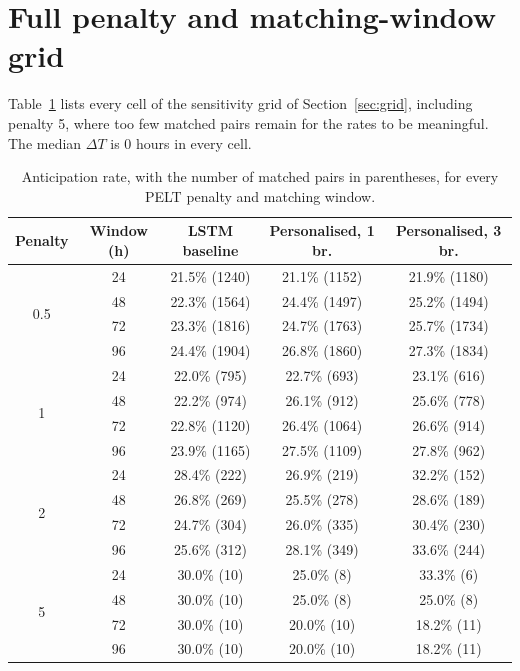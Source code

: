 \documentclass[preprint,12pt,authoryear]{elsarticle}
\newcommand{\dt}{$\Delta T$}
\providecommand{\DIFaddtex}[1]{{\protect\color{blue} \sf #1}} %
\providecommand{\DIFaddbegin}{} %
\providecommand{\DIFaddend}{} %
\providecommand{\DIFadd}[1]{\texorpdfstring{\DIFaddtex{#1}}{#1}} %
\newcommand{\DIFaddincludegraphics}[2][]{{\color{blue}\fbox{\DIFOincludegraphics[#1]{#2}}}} %
\DeclareRobustCommand{\DIFaddbegin}{\DIFOaddbegin \let\includegraphics\DIFaddincludegraphics} %
\DeclareRobustCommand{\DIFaddend}{\DIFOaddend \let\includegraphics\DIFOincludegraphics} %
\begin{document}
\section{Full penalty and matching-window grid}
\label{app:grid}

\DIFadd{Table~\ref{tab:grid} lists every cell of the sensitivity grid of
Section~\ref{sec:grid}, including penalty 5, where too few matched
pairs remain for the rates to be meaningful. The median \dt{} is 0
hours in every cell}\DIFaddend .

\DIFaddbegin \begin{table}[h]
\centering
\caption{Anticipation rate, with the number of matched pairs in
parentheses, for every PELT penalty and matching window.}
\label{tab:grid}
\small
\begin{tabular}{ccccc}
\toprule
Penalty & Window (h) & LSTM baseline & Personalised, 1 br. & Personalised, 3 br. \\
\midrule
\multirow{4}{*}{0.5} & 24 & 21.5\% (1240) & 21.1\% (1152) & 21.9\% (1180) \\
 & 48 & 22.3\% (1564) & 24.4\% (1497) & 25.2\% (1494) \\
 & 72 & 23.3\% (1816) & 24.7\% (1763) & 25.7\% (1734) \\
 & 96 & 24.4\% (1904) & 26.8\% (1860) & 27.3\% (1834) \\
\midrule
\multirow{4}{*}{1} & 24 & 22.0\% (795) & 22.7\% (693) & 23.1\% (616) \\
 & 48 & 22.2\% (974) & 26.1\% (912) & 25.6\% (778) \\
 & 72 & 22.8\% (1120) & 26.4\% (1064) & 26.6\% (914) \\
 & 96 & 23.9\% (1165) & 27.5\% (1109) & 27.8\% (962) \\
\midrule
\multirow{4}{*}{2} & 24 & 28.4\% (222) & 26.9\% (219) & 32.2\% (152) \\
 & 48 & 26.8\% (269) & 25.5\% (278) & 28.6\% (189) \\
 & 72 & 24.7\% (304) & 26.0\% (335) & 30.4\% (230) \\
 & 96 & 25.6\% (312) & 28.1\% (349) & 33.6\% (244) \\
\midrule
\multirow{4}{*}{5} & 24 & 30.0\% (10) & 25.0\% (8) & 33.3\% (6) \\
 & 48 & 30.0\% (10) & 25.0\% (8) & 25.0\% (8) \\
 & 72 & 30.0\% (10) & 20.0\% (10) & 18.2\% (11) \\
 & 96 & 30.0\% (10) & 20.0\% (10) & 18.2\% (11) \\
\bottomrule
\end{tabular}
\end{table}
\end{document}
